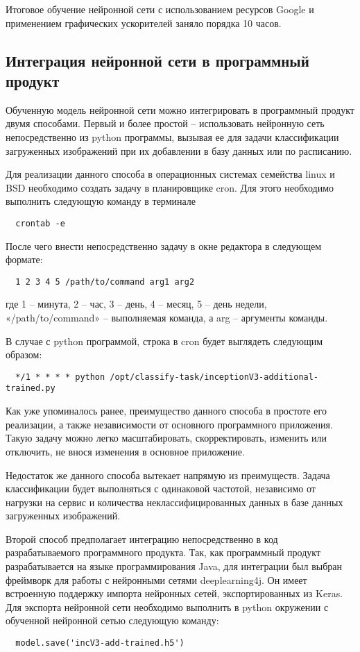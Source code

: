 Итоговое обучение нейронной сети с использованием ресурсов Google и применением графических ускорителей заняло порядка 10 часов. 

\subsection{Интеграция нейронной сети в программный продукт}

Обученную модель нейронной сети можно интегрировать в программный продукт двумя способами. 
Первый и более простой – использовать нейронную сеть непосредственно из python программы, вызывая ее для задачи классификации загруженных изображений при их добавлении в базу данных или по расписанию.


Для реализации данного способа в операционных системах семейства linux и BSD необходимо создать задачу в планировщике cron. 
Для этого необходимо выполнить следующую команду в терминале
\begin{lstlisting}
  crontab -e
\end{lstlisting}
После чего внести непосредственно задачу в окне редактора в следующем формате:
\begin{lstlisting}
  1 2 3 4 5 /path/to/command arg1 arg2
\end{lstlisting}
где 1 – минута, 2 – час, 3 – день, 4 – месяц, 5 – день недели, «/path/to/command» – выполняемая команда, а arg – аргументы команды.


В случае с python программой, строка в cron будет выглядеть следующим образом:
\begin{lstlisting}
  */1 * * * * python /opt/classify-task/inceptionV3-additional-trained.py
\end{lstlisting}

Как уже упоминалось ранее, преимущество данного способа в простоте его реализации, а также независимости от основного программного приложения. 
Такую задачу можно легко масштабировать, скорректировать, изменить или отключить, не внося изменения в основное приложение.


Недостаток же данного способа вытекает напрямую из преимуществ. 
Задача классификации будет выполняться с одинаковой частотой, независимо от нагрузки на сервис и количества неклассифицированных данных в базе данных загруженных изображений.


Второй способ предполагает интеграцию непосредственно в код разрабатываемого программного продукта. 
Так, как программный продукт разрабатывается на языке программирования Java, для интеграции был выбран фреймворк для работы с нейронными сетями deeplearning4j. 
Он имеет встроенную поддержку импорта нейронных сетей, экспортированных из Keras. 
Для экспорта нейронной сети необходимо выполнить в python окружении с обученной нейронной сетью следующую команду:
\begin{lstlisting}
  model.save('incV3-add-trained.h5')
\end{lstlisting}

